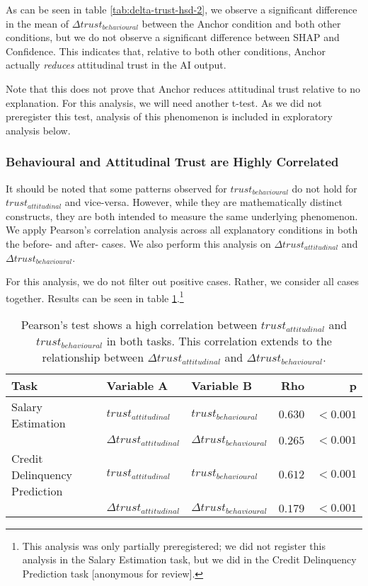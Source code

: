 As can be seen in table \ref{tab:delta-trust-hsd-2}, we observe a significant difference in the mean of $\Delta trust_{behavioural}$ between the Anchor condition and both other conditions, but we do not observe a significant difference between SHAP and Confidence. This indicates that, relative to both other conditions, Anchor actually \emph{reduces} attitudinal trust in the AI output.

Note that this does not prove that Anchor reduces attitudinal trust relative to no explanation. For this analysis, we will need another t-test. As we did not preregister this test, analysis of this phenomenon is included in exploratory analysis below.

\subsubsection{Behavioural and Attitudinal Trust are Highly Correlated}
It should be noted that some patterns observed for $trust_{behavioural}$ do not hold for $trust_{attitudinal}$ and vice-versa. However, while they are mathematically distinct constructs, they are both intended to measure the same underlying phenomenon. We apply Pearson's correlation analysis across all explanatory conditions in both the before- and after- cases. We also perform this analysis on $\Delta trust_{attitudinal}$ and $\Delta trust_{behavioural}$. 

For this analysis, we do not filter out positive cases. Rather, we consider all cases together. Results can be seen in table \ref{tab:trust-correlation}.\footnote{This analysis was only partially preregistered; we did not register this analysis in the Salary Estimation task, but we did in the Credit Delinquency Prediction task [anonymous for review].}

\begin{table}[htb]
    \caption{Pearson's test shows a high correlation between $trust_{attitudinal}$ and $trust_{behavioural}$ in both tasks. This correlation extends to the relationship between $\Delta trust_{attitudinal}$ and $\Delta trust_{behavioural}$.}
    \label{tab:trust-correlation}
    \begin{tabular}{lllrr}
        \toprule
        Task & Variable A & Variable B & Rho & p \\
        \midrule
        Salary Estimation & $trust_{attitudinal}$ & $trust_{behavioural}$ & $\mathbf{0.630}$ & $\mathbf{<0.001}$ \\
        & $\Delta trust_{attitudinal}$ & $\Delta trust_{behavioural}$ & $\mathbf{0.265}$ & $\mathbf{<0.001}$ \\
        \midrule
        Credit Delinquency Prediction & $trust_{attitudinal}$ & $trust_{behavioural}$ & $\mathbf{0.612}$ & $\mathbf{<0.001}$ \\
        & $\Delta trust_{attitudinal}$ & $\Delta trust_{behavioural}$ & $\mathbf{0.179}$ & $\mathbf{<0.001}$ \\
        \bottomrule
    \end{tabular}
\end{table}

